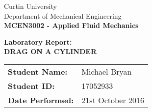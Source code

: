 \begin{titlepage}
  \begin{center}

    \begin{spacing}{1.5}
      Curtin University\\
      Department of Mechanical Engineering \\[0.5cm]
      \textbf{\large MCEN3002 - Applied Fluid Mechanics}\\
    \end{spacing}

    \vspace*{\fill}

    \begin{spacing}{2.5}
      \textbf{\huge Laboratory Report:}\\
      \textbf{\huge DRAG ON A CYLINDER}
    \end{spacing}

    \vspace*{\fill}

      \begin{flushright}
        \begin{tabular}{ll}
        \textbf{Student Name:} & Michael Bryan \\
        \textbf{Student ID:} & 17052933 \\
        \textbf{Date Performed:} & 21st October 2016 \\
        \end{tabular}
      \end{flushright}
  \end{center}
\end{titlepage}
